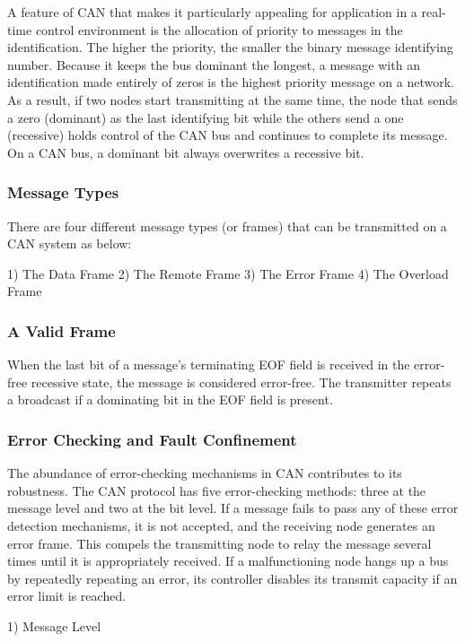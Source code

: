 A feature of CAN that makes it particularly appealing for application in a real-time control environment is the allocation of priority to messages in the identification. The higher the priority, the smaller the binary message identifying number. Because it keeps the bus dominant the longest, a message with an identification made entirely of zeros is the highest priority message on a network. As a result, if two nodes start transmitting at the same time, the node that sends a zero (dominant) as the last identifying bit while the others send a one (recessive) holds control of the CAN bus and continues to complete its message. On a CAN bus, a dominant bit always overwrites a recessive bit.

\subsubsection{Message Types}
There are four different message types (or frames) that can be transmitted on a CAN system as below:

1) The Data Frame
2) The Remote Frame
3) The Error Frame
4) The Overload Frame


\subsubsection{A Valid Frame}

When the last bit of a message's terminating EOF field is received in the error-free recessive state, the message is considered error-free. The transmitter repeats a broadcast if a dominating bit in the EOF field is present.

\subsubsection{Error Checking and Fault Confinement}

The abundance of error-checking mechanisms in CAN contributes to its robustness. The CAN protocol has five error-checking methods: three at the message level and two at the bit level. If a message fails to pass any of these error detection mechanisms, it is not accepted, and the receiving node generates an error frame. This compels the transmitting node to relay the message several times until it is appropriately received. If a malfunctioning node hangs up a bus by repeatedly repeating an error, its controller disables its transmit capacity if an error limit is reached.


1) Message Level



